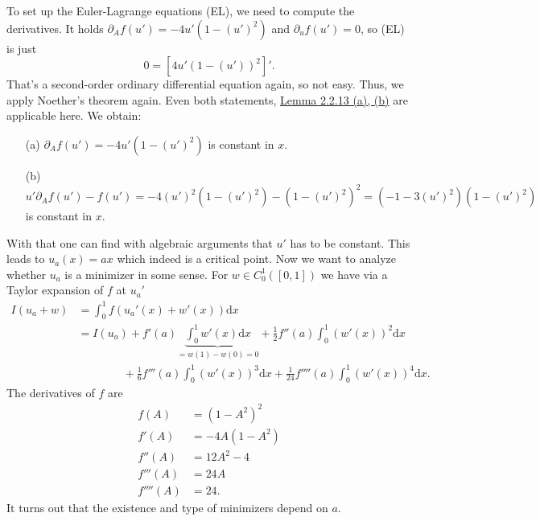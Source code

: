 To set up the Euler-Lagrange equations (EL), we need to compute the derivatives. It holds $\partial_Af(u')=-4u'(1-(u')^2)$ and $\partial_uf(u')=0$, so (EL) is just
\[0=[4u'(1-(u'))^2]'.\]
That's a second-order ordinary differential equation again, so not easy. Thus, we apply Noether's theorem again. Even both statements, \hyperlink{lemma_2_2_13}{Lemma 2.2.13 (a), (b)} are applicable here. We obtain:
\begin{itemize}
	\item[(a)] $\partial_Af(u')=-4u'(1-(u')^2)$ is constant in $x$.
	\item[(b)] $u'\partial_Af(u')-f(u')=-4(u')^2(1-(u')^2)-(1-(u')^2)^2=(-1-3(u')^2)(1-(u')^2)$ is constant in $x$.
\end{itemize}
With that one can find with algebraic arguments that $u'$ has to be constant. This leads to $u_a(x)=ax$ which indeed is a critical point. Now we want to analyze whether $u_a$ is a minimizer in some sense. For $w\in C_0^1([0,1])$ we have via a Taylor expansion of $f$ at $u_a'$
\begin{align*}
	I(u_a+w)&=\int_0^1{f(u_a'(x)+w'(x))\mathrm{d}x}\\
	&=I(u_a)+f'(a)\underbrace{\int_0^1{w'(x)\mathrm{d}x}}_{=w(1)-w(0)=0}+\frac{1}{2}f''(a)\int_0^1{(w'(x))^2\mathrm{d}x}\\
	&\qquad\qquad+\frac{1}{6}f'''(a)\int_0^1{(w'(x))^3\mathrm{d}x}+\frac{1}{24}f''''(a)\int_0^1{(w'(x))^4\mathrm{d}x}.
\end{align*}
The derivatives of $f$ are
\begin{align*}
	f(A)&=(1-A^2)^2\\
	f'(A)&=-4A(1-A^2)\\
	f''(A)&=12A^2-4\\
	f'''(A)&=24A\\
	f''''(A)&=24.
\end{align*}
It turns out that the existence and type of minimizers depend on $a$.
